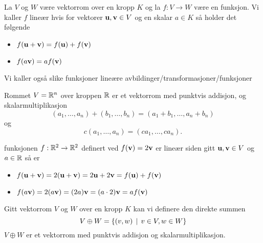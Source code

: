 \begin{definisjon}\label{Def:LinAvb}
    La $V$ og $W$ være vektorrom over en kropp $K$ og la $f: V\to W$ være en funksjon. Vi kaller $f$ lineær hvis
for vektorer $\textbf{u},\textbf{v}\in V$ og en skalar $a\in K$ så holder det følgende
    \begin{itemize}
    \item $f(\textbf{u}+\textbf{v}) = f(\textbf{u})+f(\textbf{v})$
    \item $f(a\textbf{v}) = af(\textbf{v})$
    \end{itemize}
    Vi kaller også slike funksjoner lineære avbildinger/transformasjoner/funksjoner
\end{definisjon}

\begin{eksempel}\label{Ex:EukVRom}
    Rommet $V = \mathbb{R}^n$ over kroppen $\mathbb{R}$ er et vektorrom med punktvis addisjon, og skalarmultiplikasjon
    \[(a_1,\dots,a_n)+(b_1,\dots,b_n) = (a_1+b_1,\dots,a_n+b_n)\]
    og
    \[c(a_1,\dots,a_n)=(ca_1,\dots,ca_n).\]
\end{eksempel}

\begin{eksempel}\label{Ex:label}
    funksjonen $f:\mathbb{R}^2\to\mathbb{R}^2$ definert ved $f(\textbf{v}) = 2\textbf{v}$ er lineær siden gitt $\textbf{u},\textbf{v}\in V$
og $a\in\mathbb{R}$ så er
    \begin{itemize}
        \item $f(\textbf{u}+\textbf{v}) = 2(\textbf{u}+\textbf{v}) = 2\textbf{u}+2\textbf{v} = f(\textbf{u})+f(\textbf{v})$
        \item $f(a\textbf{v}) = 2(a\textbf{v}) = (2a)\textbf{v} = (a\cdot2)\textbf{v} = af(\textbf{v})$
    \end{itemize}
\end{eksempel}

\begin{definisjon}\label{def:VDS}
  Gitt vektorrom $V$ og $W$ over en kropp $K$ kan vi
  definere den direkte summen
  \[V\oplus W = \left\{(v,w)\,\mid\,v\in V, w\in W\right\}\]
  $V\oplus W$ er et vektorrom med punktvis addisjon og
  skalarmultiplikasjon.
\end{definisjon}
